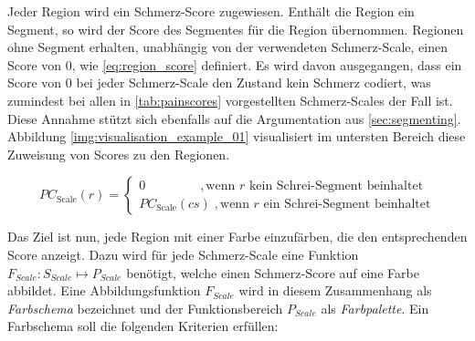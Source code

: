Jeder Region wird ein Schmerz-Score zugewiesen. Enthält die Region ein Segment, so wird der Score des Segmentes für die Region übernommen. Regionen ohne Segment erhalten, unabhängig von der verwendeten Schmerz-Scale, einen Score von 0, wie \autoref{eq:region_score} definiert. Es wird davon ausgegangen, dass ein Score von 0 bei jeder Schmerz-Scale den Zustand \glqq kein Schmerz\grqq{} codiert, was zumindest bei allen in \autoref{tab:painscores} vorgestellten Schmerz-Scales der Fall ist. Diese Annahme stützt sich ebenfalls auf die Argumentation aus \autoref{sec:segmenting}. Abbildung \ref{img:visualisation_example_01} visualisiert im untersten Bereich diese Zuweisung von Scores zu den Regionen.

\begin{equation}
PC_{\text{Scale}}(r) = \begin{cases}
 0 \qquad \qquad \;,  \text{wenn } r  \text{ kein Schrei-Segment beinhaltet} \\
 PC_{\text{Scale}}(cs) \;, \text{wenn } r  \text{ ein Schrei-Segment beinhaltet}
 \end{cases}	
 \label{eq:region_score}
\end{equation}

Das Ziel ist nun, jede Region mit einer Farbe einzufärben, die den entsprechenden Score anzeigt. Dazu wird für jede Schmerz-Scale eine Funktion $F_{Scale}:S_{Scale} \mapsto P_{Scale}$ benötigt, welche einen Schmerz-Score auf eine Farbe abbildet. Eine Abbildungsfunktion $F_{Scale}$ wird in diesem Zusammenhang als \emph{Farbschema} bezeichnet und der Funktionsbereich $P_{Scale}$ als \emph{Farbpalette}. Ein Farbschema soll die folgenden Kriterien erfüllen:

